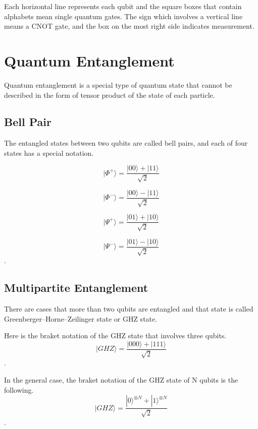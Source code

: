 Each horizontal line represents each qubit and the square boxes that contain alphabets mean single quantum gates.  The sign which involves a vertical line means a CNOT gate, and the box on the most right side indicates measurement. 

\section{Quantum Entanglement}

Quantum entanglement is a special type of quantum state that cannot be described in the form of tensor product of the state of each particle.

\subsection{Bell Pair}
The entangled states between two qubits are called bell pairs, and each of four states has a special notation.

\begin{equation}
  |\Phi^+\rangle = \frac{|00\rangle + |11\rangle}{\sqrt{2}}
  \end{equation}
  
  \begin{equation}
 |\Phi^-\rangle = \frac{|00\rangle - |11\rangle}{\sqrt{2}}
 \end{equation}
 
 \begin{equation}
 |\Psi^+\rangle = \frac{|01\rangle + |10\rangle}{\sqrt{2}}
 \end{equation}
 
 \begin{equation}
  |\Psi^-\rangle = \frac{|01\rangle - |10\rangle}{\sqrt{2}}
  \end{equation}.

\subsection{Multipartite Entanglement}
There are cases that more than two qubits are entangled and that state is called Greenberger–Horne–Zeilinger state or GHZ state.

Here is the braket notation of the GHZ state that involves three qubits.
\begin{equation}
  |GHZ\rangle = \frac{|000\rangle + |111\rangle}{\sqrt{2}}
\end{equation}.

In the general case, the braket notation of the GHZ state of N qubits is the following.
\begin{equation}
  |GHZ\rangle = \frac{|0\rangle^{\otimes N} + |1\rangle^{\otimes N}}{\sqrt{2}}
\end{equation}.

